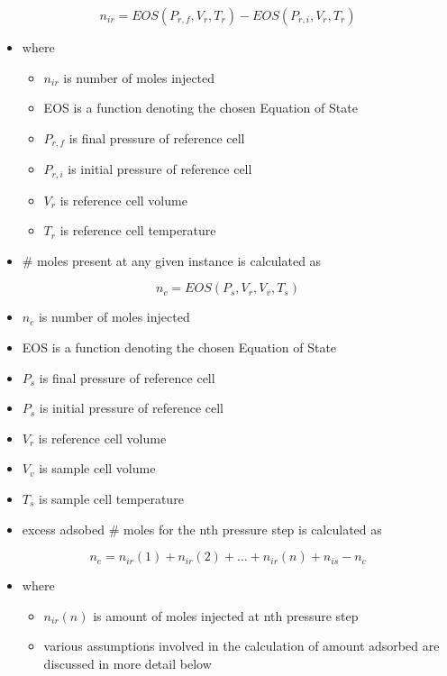 \documentclass[11pt]{article}
\begin{document}
\begin{equation}
n_{ir} = EOS(P_{r,f},V_r,T_r) - EOS(P_{r,i},V_r,T_r)
\end{equation}
\begin{itemize}
\item where
\begin{itemize}
\item \(n_{ir}\) is number of moles injected
\item EOS is a function denoting the chosen Equation of State
\item \(P_{r,f}\) is final pressure of reference cell
\item \(P_{r,i}\) is initial pressure of reference cell
\item \(V_r\) is reference cell volume
\item \(T_r\) is reference cell temperature
\end{itemize}
\item \# moles present at any given instance is calculated as
\end{itemize}
\begin{equation}
n_{c} = EOS(P_s,V_r,V_v,T_s)
\end{equation}
\begin{itemize}
\item \(n_{c}\) is number of moles injected
\item EOS is a function denoting the chosen Equation of State
\item \(P_{s}\) is final pressure of reference cell
\item \(P_{s}\) is initial pressure of reference cell
\item \(V_r\) is reference cell volume
\item \(V_v\) is sample cell volume
\item \(T_s\) is sample cell temperature
\end{itemize}
\begin{itemize}
\item excess adsobed \# moles for the nth pressure step is calculated as
\end{itemize}
\begin{equation}
n_{e} = n_{ir}(1) + n_{ir}(2) + \dots + n_{ir}(n) + n_{is} - n_c
\end{equation}
\begin{itemize}
\item where
\begin{itemize}
\item \(n_{ir}(n)\) is amount of moles injected at nth pressure step
\item various assumptions involved in the calculation of amount adsorbed are discussed in more detail below
\end{itemize}
\end{itemize}
\end{document}
